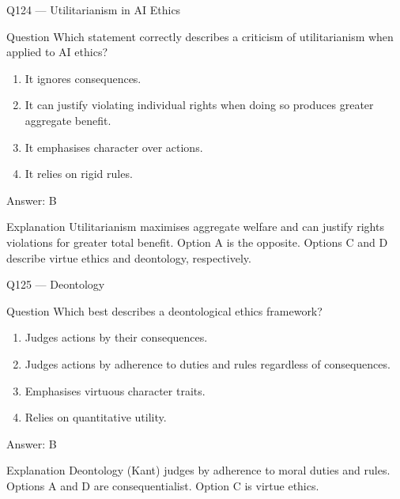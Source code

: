 \documentclass[aspectratio=169,8pt]{beamer}
\begin{document}
\begin{frame}{Q124 --- Utilitarianism in AI Ethics}
\begin{block}{Question}
Which statement correctly describes a criticism of utilitarianism when applied to AI ethics?
\begin{enumerate}
\item It ignores consequences.
\item It can justify violating individual rights when doing so produces greater aggregate benefit.
\item It emphasises character over actions.
\item It relies on rigid rules.
\end{enumerate}
	\end{block}
\begin{exampleblock}{Answer: B}\end{exampleblock}
\begin{block}{Explanation}
Utilitarianism maximises aggregate welfare and can justify rights violations for greater total benefit. Option A is the opposite. Options C and D describe virtue ethics and deontology, respectively.
\end{block}
\end{frame}

\begin{frame}{Q125 --- Deontology}
\begin{block}{Question}
Which best describes a deontological ethics framework?
\begin{enumerate}
\item Judges actions by their consequences.
\item Judges actions by adherence to duties and rules regardless of consequences.
\item Emphasises virtuous character traits.
\item Relies on quantitative utility.
\end{enumerate}
	\end{block}
\begin{exampleblock}{Answer: B}\end{exampleblock}
\begin{block}{Explanation}
Deontology (Kant) judges by adherence to moral duties and rules. Options A and D are consequentialist. Option C is virtue ethics.
\end{block}
\end{frame}
\end{document}
